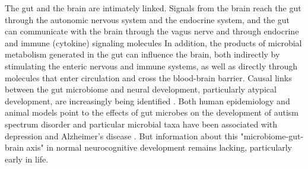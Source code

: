 The gut and the brain are intimately linked. Signals from the brain
reach the gut through the autonomic nervous system and the endocrine
system, and the gut can communicate with the brain through the vagus
nerve and through endocrine and immune (cytokine) signaling molecules
\cite{cerdoEarlyNutritionGut2019,pronovostPerinatalInteractionsMicrobiome2019,sharonCentralNervousSystem2016,togniniGutMicrobiotaPotential2017}
In addition, the products of microbial metabolism generated in the gut can
influence the brain, both indirectly by stimulating the enteric nervous
and immune systems, as well as directly through molecules that enter
circulation and cross the blood-brain barrier. Causal links between the
gut microbiome and neural development, particularly atypical
development, are increasingly being identified \cite{spichakMiningMicrobesMental2021}.
Both human epidemiology and animal models point to the effects
of gut microbes on the development of autism spectrum disorder
\cite{laueProspectiveAssociationsInfant2020,wanUnderdevelopmentGutMicrobiota2021}
and particular microbial taxa have been associated with depression
\cite{mayneris-perxachsMicrobiotaAlterationsProline2022,valles-colomerNeuroactivePotentialHuman2019}
and Alzheimer's disease \cite{fungInteractionsMicrobiotaImmune2017,kimProbioticSupplementationImproves2021}.
But information about this "microbiome-gut-brain
axis" in normal neurocognitive development remains lacking,
particularly early in life.

